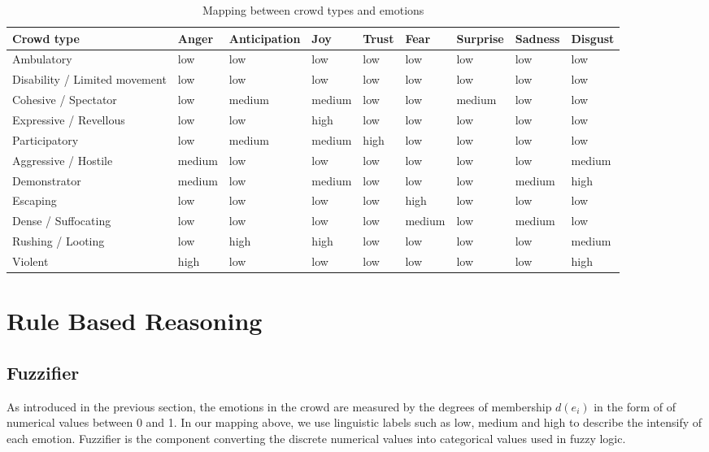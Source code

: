 \begin{table}
\caption{Mapping between crowd types and emotions}
\label{table:mappingEmotionCrowdType}
\begin{tabular}{|p{2cm}|p{1.2cm}|p{2cm}|p{1.2cm}|p{1.2cm}|p{1.2cm}|p{1.2cm}|p{1.2cm}|p{1.2cm}|}
\hline
\textbf{Crowd type} & \textbf{Anger} & \textbf{Anticipation} & \textbf{Joy} & \textbf{Trust} & \textbf{Fear} & \textbf{Surprise} & \textbf{Sadness} & \textbf{Disgust} \\
\hline
Ambulatory & low & low & low & low & low & low & low & low \\
\hline
Disability / Limited movement & low & low & low & low & low & low & low & low \\
\hline
Cohesive / Spectator & low & medium & medium & low & low & medium & low & low \\
\hline
Expressive / Revellous & low & low & high & low & low & low & low & low \\
\hline
Participatory & low & medium & medium & high & low & low & low & low \\
\hline
Aggressive / Hostile & medium & low & low & low & low & low & low & medium \\
\hline
Demonstrator & medium & low & medium & low & low & low & medium & high \\
\hline
Escaping & low & low & low & low & high & low & low & low \\
\hline
Dense / Suffocating	& low & low & low & low & medium & low & medium & low \\
\hline
Rushing	/ Looting & low & high & high & low & low & low & low & medium \\
\hline
Violent	& high & low & low & low & low & low & low & high \\
\hline
\end{tabular}
\end{table}

\section{Rule Based Reasoning}

\subsection{Fuzzifier}
As introduced in the previous section, the emotions in the crowd are measured by the degrees of membership \(d(e_i)\) in the form of of numerical values between 0 and 1. In our mapping above, we use linguistic labels such as low, medium and high to describe the intensify of each emotion. Fuzzifier is the component converting the discrete numerical values into categorical values used in fuzzy logic. 

